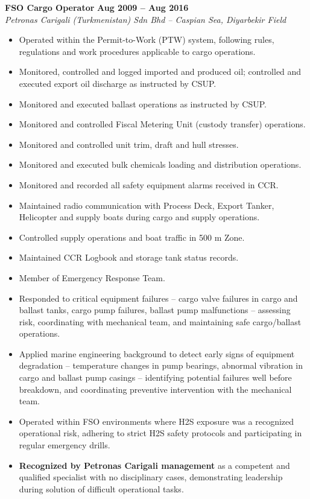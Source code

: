 \documentclass[11pt,a4paper]{article}
\begin{document}
\textbf{\color{avcsdark}FSO Cargo Operator} \hfill \textbf{\color{avcsgray}Aug 2009 -- Aug 2016} \\
\textit{Petronas Carigali (Turkmenistan) Sdn Bhd -- Caspian Sea, Diyarbekir Field} \\
\vspace{2pt}
\begin{itemize}[leftmargin=*, nosep, itemsep=2pt]
    \item Operated within the Permit-to-Work (PTW) system, following rules, regulations and work procedures applicable to cargo operations.
    \item Monitored, controlled and logged imported and produced oil; controlled and executed export oil discharge as instructed by CSUP.
    \item Monitored and executed ballast operations as instructed by CSUP.
    \item Monitored and controlled Fiscal Metering Unit (custody transfer) operations.
    \item Monitored and controlled unit trim, draft and hull stresses.
    \item Monitored and executed bulk chemicals loading and distribution operations.
    \item Monitored and recorded all safety equipment alarms received in CCR.
    \item Maintained radio communication with Process Deck, Export Tanker, Helicopter and supply boats during cargo and supply operations.
    \item Controlled supply operations and boat traffic in 500 m Zone.
    \item Maintained CCR Logbook and storage tank status records.
    \item Member of Emergency Response Team.
    \item Responded to critical equipment failures -- cargo valve failures in cargo and ballast tanks, cargo pump failures, ballast pump malfunctions -- assessing risk, coordinating with mechanical team, and maintaining safe cargo/ballast operations.
    \item Applied marine engineering background to detect early signs of equipment degradation -- temperature changes in pump bearings, abnormal vibration in cargo and ballast pump casings -- identifying potential failures well before breakdown, and coordinating preventive intervention with the mechanical team.
    \item Operated within FSO environments where H2S exposure was a recognized operational risk, adhering to strict H2S safety protocols and participating in regular emergency drills.
    \item \textbf{Recognized by Petronas Carigali management} as a competent and qualified specialist with no disciplinary cases, demonstrating leadership during solution of difficult operational tasks.
\end{itemize}
\end{document}
